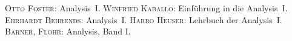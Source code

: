 \documentclass[ngerman,titlepage,twoside, parskip=half*]{scrreprt}
\theoremstyle{break}
\theoremstyle{nonumberbreak}
\begin{document}
\clearpage
\begin{thebibliography}{99}
 \textsc{Otto Foster}: Analysis~I.
 \textsc{Winfried Kaballo}: Einführung in die Analysis~I.
 \textsc{Ehrhardt Behrends}: Analysis~I.
 \textsc{Harro Heuser}: Lehrbuch der Analysis~I.
 \textsc{Barner}, \textsc{Flohr}: Analysis, Band I.
\end{thebibliography}

\printindex
\end{document}
